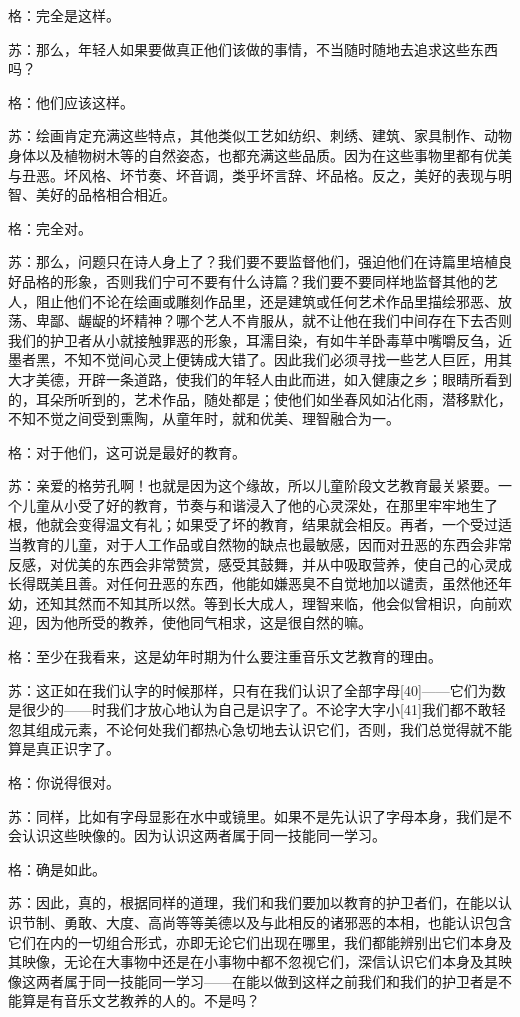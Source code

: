 \documentclass[12pt,oneside]{book}
\begin{document}
格：完全是这样。

苏：那么，年轻人如果要做真正他们该做的事情，不当随时随地去追求这些东西吗？

格：他们应该这样。

苏：绘画肯定充满这些特点，其他类似工艺如纺织、刺绣、建筑、家具制作、动物身体以及植物树木等的自然姿态，也都充满这些品质。因为在这些事物里都有优美与丑恶。坏风格、坏节奏、坏音调，类乎坏言辞、坏品格。反之，美好的表现与明智、美好的品格相合相近。

格：完全对。

苏：那么，问题只在诗人身上了？我们要不要监督他们，强迫他们在诗篇里培植良好品格的形象，否则我们宁可不要有什么诗篇？我们要不要同样地监督其他的艺人，阻止他们不论在绘画或雕刻作品里，还是建筑或任何艺术作品里描绘邪恶、放荡、卑鄙、龌龊的坏精神？哪个艺人不肯服从，就不让他在我们中间存在下去否则我们的护卫者从小就接触罪恶的形象，耳濡目染，有如牛羊卧毒草中嘴嚼反刍，近墨者黑，不知不觉间心灵上便铸成大错了。因此我们必须寻找一些艺人巨匠，用其大才美德，开辟一条道路，使我们的年轻人由此而进，如入健康之乡；眼睛所看到的，耳朵所听到的，艺术作品，随处都是；使他们如坐春风如沾化雨，潜移默化，不知不觉之间受到熏陶，从童年时，就和优美、理智融合为一。

格：对于他们，这可说是最好的教育。

苏：亲爱的格劳孔啊！也就是因为这个缘故，所以儿童阶段文艺教育最关紧要。一个儿童从小受了好的教育，节奏与和谐浸入了他的心灵深处，在那里牢牢地生了根，他就会变得温文有礼；如果受了坏的教育，结果就会相反。再者，一个受过适当教育的儿童，对于人工作品或自然物的缺点也最敏感，因而对丑恶的东西会非常反感，对优美的东西会非常赞赏，感受其鼓舞，并从中吸取营养，使自己的心灵成长得既美且善。对任何丑恶的东西，他能如嫌恶臭不自觉地加以谴责，虽然他还年幼，还知其然而不知其所以然。等到长大成人，理智来临，他会似曾相识，向前欢迎，因为他所受的教养，使他同气相求，这是很自然的嘛。

格：至少在我看来，这是幼年时期为什么要注重音乐文艺教育的理由。

苏：这正如在我们认字的时候那样，只有在我们认识了全部字母[40]——它们为数是很少的——时我们才放心地认为自己是识字了。不论字大字小[41]我们都不敢轻忽其组成元素，不论何处我们都热心急切地去认识它们，否则，我们总觉得就不能算是真正识字了。

格：你说得很对。

苏：同样，比如有字母显影在水中或镜里。如果不是先认识了字母本身，我们是不会认识这些映像的。因为认识这两者属于同一技能同一学习。

格：确是如此。

苏：因此，真的，根据同样的道理，我们和我们要加以教育的护卫者们，在能以认识节制、勇敢、大度、高尚等等美德以及与此相反的诸邪恶的本相，也能认识包含它们在内的一切组合形式，亦即无论它们出现在哪里，我们都能辨别出它们本身及其映像，无论在大事物中还是在小事物中都不忽视它们，深信认识它们本身及其映像这两者属于同一技能同一学习——在能以做到这样之前我们和我们的护卫者是不能算是有音乐文艺教养的人的。不是吗？
\end{document}
